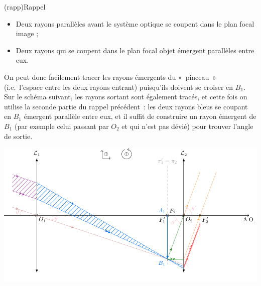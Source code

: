 \documentclass[../../main/main.tex]{subfiles}
\begin{document}
{	\begin{center}
		\begin{tcb}[width=\linewidth](rapp){Rappel}
			\begin{itemize}
				\item Deux rayons parallèles avant le système optique se coupent
				      dans le plan focal image ;
				\item Deux rayons qui se coupent dans le plan focal objet émergent
				      parallèles entre eux.
			\end{itemize}
		\end{tcb}
	\end{center}

	On peut donc facilement tracer les rayons émergents du «~pinceau~» (i.e.\
	l'espace entre les deux rayons entrant) puisqu'ils doivent se croiser en $B_1$.
	Sur le schéma suivant, les rayons sortant sont également tracés, et cette fois
	on utilise la seconde partie du rappel précédent~: les deux rayons bleus se
	coupant en $B_1$ émergent parallèle entre eux, et il suffit de construire un
	rayon émergent de $B_1$ (par exemple celui passant par $O_2$ et qui n'est pas
	dévié) pour trouver l'angle de sortie.

	\begin{center}
		\includegraphics[width=\linewidth]{kepler.pdf}
	\end{center}

}
\end{document}
